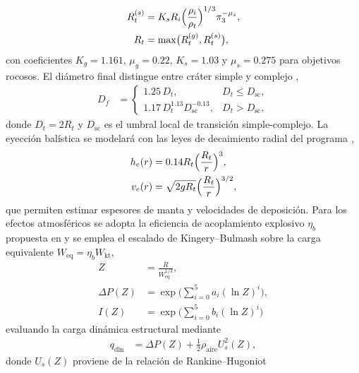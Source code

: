 \documentclass[conference]{IEEEtran}
\begin{document}
\begin{itemize}
\begin{align}
		      R_t^{(s)} & = K_s R_i \Bigl(\frac{\rho_i}{\rho_t}\Bigr)^{1/3}\pi_3^{-\mu_s}, \label{eq:rt-strength} \\
		      R_t       & = \max\bigl(R_t^{(g)}, R_t^{(s)}\bigr), \label{eq:rt-final}
	      \end{align}
	      con coeficientes $K_g = 1.161$, $\mu_g = 0.22$, $K_s = 1.03$ y
	      $\mu_s = 0.275$ para objetivos rocosos. El diámetro final distingue entre
	      cráter simple y complejo \cite{collins2005,herrick1997},
	      \begin{align}
		      D_f & =
		      \begin{cases}
			      1.25\,D_t,                              & D_t \le D_{\text{sc}}, \\
			      1.17\,D_t^{1.13} D_{\text{sc}}^{-0.13}, & D_t > D_{\text{sc}},
		      \end{cases}\label{eq:final-crater}
	      \end{align}
	      donde $D_t = 2 R_t$ y $D_{\text{sc}}$ es el umbral local de transición
	      simple-complejo. La eyección balística se modelará con las leyes de
	      decaimiento radial del programa \cite{collins2005,herrick2006},
	      \begin{align}
		      h_e(r) & = 0.14 R_t \Bigl(\frac{R_t}{r}\Bigr)^3, \label{eq:ejecta-thickness} \\
		      v_e(r) & = \sqrt{2 g R_t}\Bigl(\frac{R_t}{r}\Bigr)^{3/2},
	      \end{align}
	      que permiten estimar espesores de manta y velocidades de deposición. Para
	      los efectos atmosféricos se adopta la eficiencia de acoplamiento explosivo
	      $\eta_b$ propuesta en \cite{collins2005} y se emplea el escalado de
	      Kingery--Bulmash \cite{ufc334002} sobre la carga equivalente
	      $W_{\text{eq}} = \eta_b W_{\text{kt}}$,
	      \begin{align}
		      Z           & = \frac{R}{W_{\text{eq}}^{1/3}},                  \\
		      \Delta P(Z) & = \exp\Biggl(\sum_{i=0}^{5} a_i (\ln Z)^i\Biggr), \\
		      I(Z)        & = \exp\Biggl(\sum_{i=0}^{5} b_i (\ln Z)^i\Biggr)
	      \end{align}
	      evaluando la carga dinámica estructural mediante
	      \begin{align}
		      q_{\text{din}} & = \Delta P(Z) + \tfrac{1}{2} \rho_{\text{aire}} U_s^2(Z),
	      \end{align}
	      donde $U_s(Z)$ proviene de la relación de Rankine--Hugoniot

\end{itemize}
\end{document}
